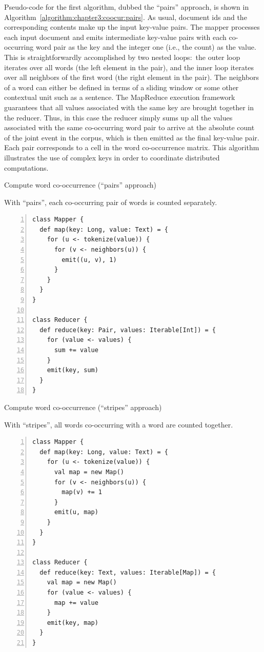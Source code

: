 Pseudo-code for the first algorithm, dubbed the ``pairs'' approach, is
shown in Algorithm~\ref{algorithm:chapter3:coocur:pairs}.  As usual,
document ids and the corresponding contents make up the input
key-value pairs.  The mapper processes each input document and emits
intermediate key-value pairs with each co-occurring word pair as the
key and the integer one (i.e., the count) as the value.  This is
straightforwardly accomplished by two nested loops:\ the outer loop
iterates over all words (the left element in the pair), and the inner
loop iterates over all neighbors of the first word (the right element
in the pair).  The neighbors of a word can either be defined in terms
of a sliding window or some other contextual unit such as a sentence.
The MapReduce execution framework guarantees that all values
associated with the same key are brought together in the reducer.
Thus, in this case the reducer simply sums up all the values
associated with the same co-occurring word pair to arrive at the
absolute count of the joint event in the corpus, which is then emitted
as the final key-value pair. Each pair corresponds to a cell in the
word co-occurrence matrix.  This algorithm illustrates the use of
complex keys in order to coordinate distributed computations.

\begin{algorithm}[p]
\caption{Compute word co-occurrence (``pairs'' approach)}
\label{algorithm:chapter3:coocur:pairs}
With ``pairs'', each co-occurring pair of words is counted separately.
\begin{small}
\begin{Verbatim}[numbers=left, xleftmargin=7.5mm]
class Mapper {
  def map(key: Long, value: Text) = {
    for (u <- tokenize(value)) {
      for (v <- neighbors(u)) {
        emit((u, v), 1)
      }
    }
  }
}

class Reducer {
  def reduce(key: Pair, values: Iterable[Int]) = {
    for (value <- values) {
      sum += value
    }
    emit(key, sum)
  }
}
\end{Verbatim}
\end{small}
\end{algorithm}

\begin{algorithm}[p]
\caption{Compute word co-occurrence (``stripes'' approach)}
\label{algorithm:chapter3:coocur:stripes}
With ``stripes'', all words co-occurring with a word are counted
together.
\begin{small}
\begin{Verbatim}[numbers=left, xleftmargin=7.5mm]
class Mapper {
  def map(key: Long, value: Text) = {
    for (u <- tokenize(value)) {
      val map = new Map()
      for (v <- neighbors(u)) {
        map(v) += 1
      }
      emit(u, map)
    }
  }
}

class Reducer {
  def reduce(key: Text, values: Iterable[Map]) = {
    val map = new Map()
    for (value <- values) {
      map += value
    }
    emit(key, map)
  }
}
\end{Verbatim}
\end{small}
\end{algorithm}

